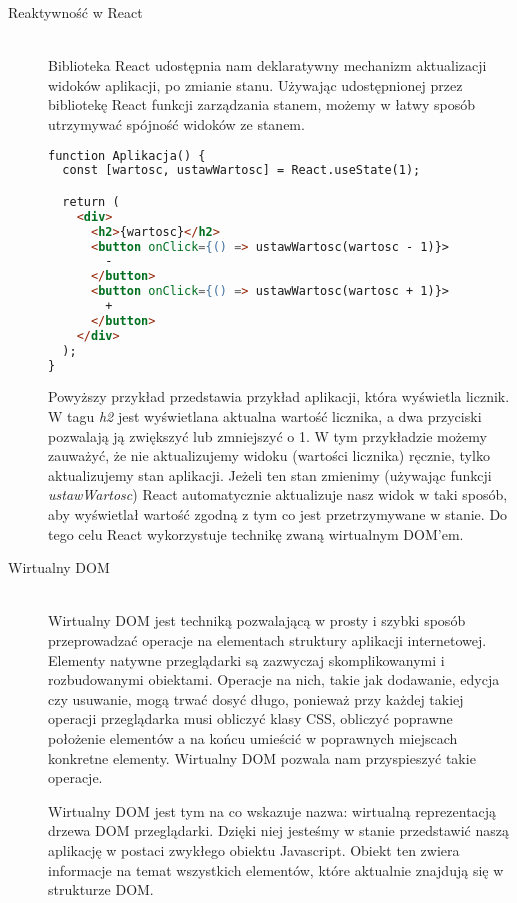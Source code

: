 \begin{description}
 \item[Reaktywność w React] \hfill \\ Biblioteka React udostępnia nam deklaratywny mechanizm aktualizacji widoków aplikacji, po zmianie stanu. Używając udostępnionej przez bibliotekę React funkcji zarządzania stanem, możemy w łatwy sposób utrzymywać spójność widoków ze stanem.

\begin{lstlisting}[language=HTML, caption=Użycie mechanizmu zarządzania stanem w React, label={lst:reactCounterCode}]
function Aplikacja() {
  const [wartosc, ustawWartosc] = React.useState(1);

  return (
    <div>
      <h2>{wartosc}</h2>
      <button onClick={() => ustawWartosc(wartosc - 1)}>
        -
      </button>
      <button onClick={() => ustawWartosc(wartosc + 1)}>
        +
      </button>
    </div>
  );
}
\end{lstlisting}

Powyższy przykład przedstawia przykład aplikacji, która wyświetla licznik. W tagu \emph{h2} jest wyświetlana aktualna wartość licznika, a dwa przyciski pozwalają ją zwiększyć lub zmniejszyć o 1. W tym przykładzie możemy zauważyć, że nie aktualizujemy widoku (wartości licznika) ręcznie, tylko aktualizujemy stan aplikacji. Jeżeli ten stan zmienimy (używając funkcji \emph{ustawWartosc}) React automatycznie aktualizuje nasz widok w taki sposób, aby wyświetlał wartość zgodną z tym co jest przetrzymywane w stanie. Do tego celu React wykorzystuje technikę zwaną wirtualnym DOM'em.

  \item[Wirtualny DOM] \hfill \\ Wirtualny DOM jest techniką pozwalającą w prosty i szybki sposób przeprowadzać operacje na elementach struktury aplikacji internetowej. Elementy natywne przeglądarki są zazwyczaj skomplikowanymi i rozbudowanymi obiektami. Operacje na nich, takie jak dodawanie, edycja czy usuwanie, mogą trwać dosyć długo, ponieważ przy każdej takiej operacji przeglądarka musi obliczyć klasy CSS, obliczyć poprawne położenie elementów a na końcu umieścić w poprawnych miejscach konkretne elementy. Wirtualny DOM pozwala nam przyspieszyć takie operacje.

  Wirtualny DOM jest tym na co wskazuje nazwa: wirtualną reprezentacją drzewa DOM przeglądarki. Dzięki niej jesteśmy w stanie przedstawić naszą aplikację w postaci zwykłego obiektu Javascript. Obiekt ten zwiera informacje na temat wszystkich elementów, które aktualnie znajdują się w strukturze DOM. 


\end{description}
